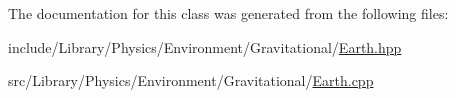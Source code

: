 The documentation for this class was generated from the following files\+:\begin{DoxyCompactItemize}
\item 
include/\+Library/\+Physics/\+Environment/\+Gravitational/\hyperlink{_gravitational_2_earth_8hpp}{Earth.\+hpp}\item 
src/\+Library/\+Physics/\+Environment/\+Gravitational/\hyperlink{_gravitational_2_earth_8cpp}{Earth.\+cpp}\end{DoxyCompactItemize}
